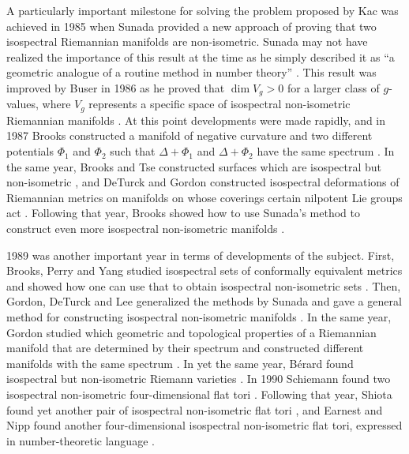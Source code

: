 \documentclass{amsart}
\theoremstyle{definition}
\begin{document}
A particularly important milestone for solving the problem proposed by Kac was achieved in 1985 when Sunada provided a new approach of proving that two isospectral Riemannian manifolds are non-isometric.  Sunada may not have realized the importance of this result at the time as he simply described it as ``a geometric analogue of a routine method in number theory'' \cite{sunada1985riemannian}. This result was improved by Buser in 1986 as he proved that $\dim V_g > 0$ for a larger class of $g$-values, where $V_g$ represents a specific space of isospectral non-isometric Riemannian manifolds \cite{buser1986isospectral}. At this point developments were made rapidly, and in 1987 Brooks constructed a manifold of negative curvature and two different potentials $\Phi_1$ and $\Phi_2$ such that $\Delta + \Phi_1$ and $\Delta + \Phi_2$ have the same spectrum \cite{brooks1987manifolds}. In the same year, Brooks and Tse constructed surfaces which are isospectral but non-isometric \cite{brooks1987isospectral}, and DeTurck and Gordon constructed isospectral deformations of Riemannian metrics on manifolds on whose coverings certain nilpotent Lie groups act \cite{deturck1987isospectral}. Following that year, Brooks showed how to use Sunada's method to construct even more isospectral non-isometric manifolds \cite{brooks1988constructing}.

1989 was another important year in terms of developments of the subject. First, Brooks, Perry and Yang studied isospectral sets of conformally equivalent metrics \cite{brooks1989isospectral} and showed how one can use that to obtain isospectral non-isometric sets \cite{brooks1989isospectral}. Then, Gordon, DeTurck and Lee generalized the methods by Sunada and gave a general method for constructing isospectral non-isometric manifolds \cite{deturck1989isospectral}. In the same year, Gordon studied which geometric and topological properties of a Riemannian manifold that are determined by their spectrum and constructed different manifolds with the same spectrum \cite{gordon1989you}. In yet the same year, Bérard found isospectral but non-isometric Riemann varieties \cite{berard1989varietes}. In 1990 Schiemann found two isospectral non-isometric four-dimensional flat tori \cite{schiemann1990beispiel}. Following that year, Shiota found yet another pair of isospectral non-isometric flat tori \cite{shiota1991theta}, and Earnest and Nipp found another four-dimensional isospectral non-isometric flat tori, expressed in number-theoretic language \cite{earnest1991theta}. 
\end{document}
